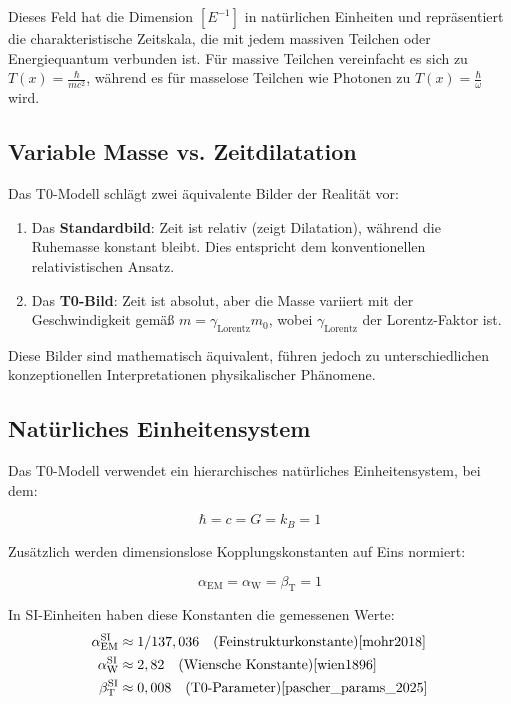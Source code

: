 \documentclass[12pt,a4paper]{article}
\newcommand{\Tfield}{T(x)}
\newcommand{\alphaEM}{\alpha_{\text{EM}}}
\newcommand{\alphaW}{\alpha_{\text{W}}}
\newcommand{\betaT}{\beta_{\text{T}}}
\newcommand{\gammaf}{\gamma_{\text{Lorentz}}}
\begin{document}
	Dieses Feld hat die Dimension $[E^{-1}]$ in natürlichen Einheiten\cite{pascher_alpha_2025} und repräsentiert die charakteristische Zeitskala, die mit jedem massiven Teilchen oder Energiequantum verbunden ist. Für massive Teilchen vereinfacht es sich zu $\Tfield = \frac{\hbar}{mc^2}$, während es für masselose Teilchen wie Photonen zu $\Tfield = \frac{\hbar}{\omega}$ wird.
	
	\subsection{Variable Masse vs. Zeitdilatation}
	\label{subsec:variable_mass}
	
	Das T0-Modell schlägt zwei äquivalente Bilder der Realität vor\cite{pascher_zeit_2025}:
	
	\begin{enumerate}
		\item Das \textbf{Standardbild}: Zeit ist relativ (zeigt Dilatation), während die Ruhemasse konstant bleibt. Dies entspricht dem konventionellen relativistischen Ansatz\cite{einstein1905}.
		\item Das \textbf{T0-Bild}: Zeit ist absolut, aber die Masse variiert mit der Geschwindigkeit gemäß $m = \gammaf m_0$, wobei $\gammaf$ der Lorentz-Faktor ist.
	\end{enumerate}
	
	Diese Bilder sind mathematisch äquivalent, führen jedoch zu unterschiedlichen konzeptionellen Interpretationen physikalischer Phänomene.
	
	\subsection{Natürliches Einheitensystem}
	\label{subsec:natural_units}
	
	Das T0-Modell verwendet ein hierarchisches natürliches Einheitensystem\cite{pascher_alphabeta_2025}, bei dem:
	
	\begin{equation}
		\label{eq:natural_units}
		\hbar = c = G = k_B = 1
	\end{equation}
	
	Zusätzlich werden dimensionslose Kopplungskonstanten auf Eins normiert:
	
	\begin{equation}
		\label{eq:dimensionless_constants}
		\alphaEM = \alphaW = \betaT = 1
	\end{equation}
	
	In SI-Einheiten haben diese Konstanten die gemessenen Werte:
	\begin{align}
		\alphaEM^{\text{SI}} &\approx 1/137,036 \quad \text{(Feinstrukturkonstante)}\cite{mohr2018} \\
		\alphaW^{\text{SI}} &\approx 2,82 \quad \text{(Wiensche Konstante)}\cite{wien1896} \\
		\betaT^{\text{SI}} &\approx 0,008 \quad \text{(T0-Parameter)}\cite{pascher_params_2025}
	\end{align}
	
\end{document}
